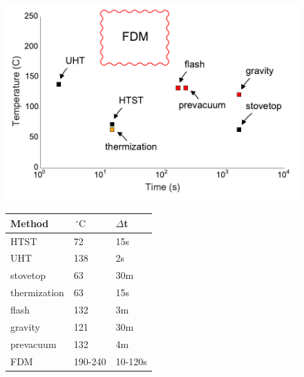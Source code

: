 \documentclass[fleqn,10pt]{wlpeerj}
\begin{document}
\begin{figure}
  \begin{minipage}[c]{0.60\linewidth}
    \centering
    \includegraphics[width=\textwidth]{Pasteurization}
    \par\vspace{0pt}
  \end{minipage}%
  \begin{minipage}[c]{0.40\linewidth}
    \centering%
    
    \begin{tabular}{@{}lll@{}}
    \toprule
    Method       & $\,^{\circ}\mathrm{C}$ & $\Delta$t \\ \midrule
    HTST         & 72      & 15s    \\
    UHT          & 138     & 2s     \\
    stovetop     & 63      & 30m    \\
    thermization & 63      & 15s    \\
    flash        & 132     & 3m     \\
    gravity      & 121     & 30m    \\
    prevacuum    & 132     & 4m     \\
    FDM          & 190-240 & 10-120s\\ \bottomrule
    \end{tabular}

    \par\vspace{0pt}
    \end{minipage}


\end{figure}
\end{document}
